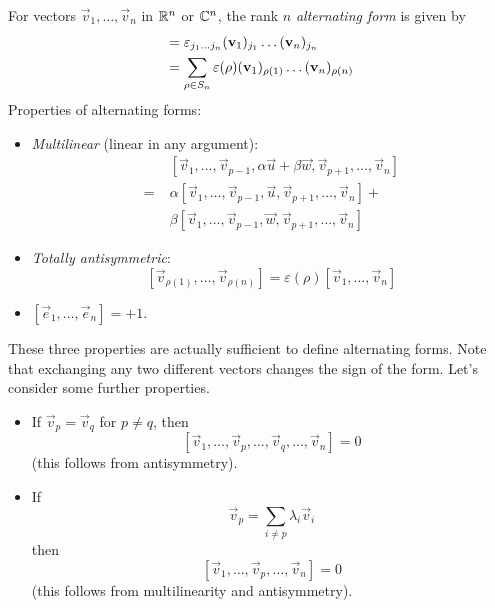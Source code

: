 \documentclass{../../template/note}
\begin{document}
    \begin{definition}
        For vectors \(\vec v_1, \dots, \vec v_n\) in \(\mathbb R^n\) or \(\mathbb C^n\), the rank \(n\) \emph{alternating form} is given by
        \begin{align*}
            [\vec v_1, \dots, \vec v_n] &= \lv{j_1\dots j_n}(\vec v_1)_{j_1}\dots (\vec v_n)_{j_n} \\
            &= \sum_{\rho \in S_n} \varepsilon(\rho) (\vec v_1)_{\rho(1)}\dots (\vec v_n)_{\rho(n)}
        \end{align*}
        Properties of alternating forms:
        \begin{itemize}
            \item \emph{Multilinear} (linear in any argument):
            \begin{align*}
                &\;[\vec v_1, \dots, \vec v_{p-1}, \alpha \vec u + \beta \vec w, \vec v_{p+1}, \dots, \vec v_n] \\
                =&\;\alpha[\vec v_1, \dots, \vec v_{p-1}, \vec u, \vec v_{p+1}, \dots, \vec v_n] + \\
                &\;\beta[\vec v_1, \dots, \vec v_{p-1}, \vec w, \vec v_{p+1}, \dots, \vec v_n]
            \end{align*}
            \item \emph{Totally antisymmetric}:
            \[
                [\vec v_{\rho(1)},\dots, \vec v_{\rho(n)}] = \varepsilon(\rho) [\vec v_1, \dots, \vec v_n]
            \]
            \item \([\vec e_1, \dots, \vec e_n] = +1\).
        \end{itemize}
    \end{definition}
    
    These three properties are actually sufficient to define alternating forms. Note that exchanging any two different vectors changes the sign of the form. Let's consider some further properties.

    \begin{itemize}
        \item If \(\vec v_p = \vec v_q\) for \(p \neq q\), then
        \[
            [\vec v_1, \dots, \vec v_p, \dots, \vec v_q, \dots, \vec v_n] = 0
        \]
        (this follows from antisymmetry).
        \item If
        \[
            \vec v_p = \sum_{i \neq p} \lambda_i \vec v_i
        \]
        then
        \[
            [\vec v_1, \dots, \vec v_p, \dots, \vec v_n] = 0
        \]
        (this follows from multilinearity and antisymmetry).
    \end{itemize}
    
\end{document}
